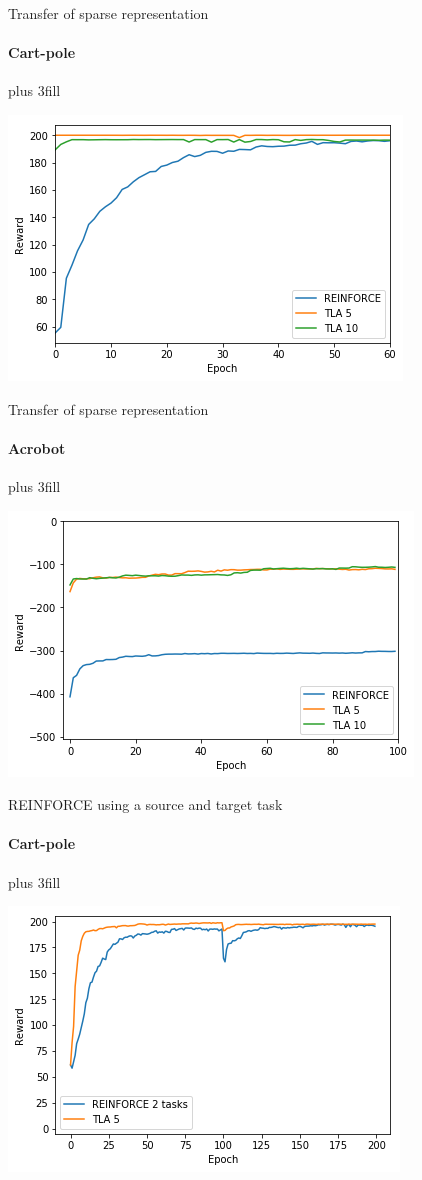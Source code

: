 \documentclass{beamer}
\begin{document}
\begin{frame}[fragile]{Transfer of sparse representation}
\framesubtitle{Cart-pole}
\vskip0pt plus 3fill
\begin{center}
    \includegraphics[width=.8\linewidth]{results/CartPole/sparse_transfer/reward_target_re-akt5-akt10.png}
\end{center}
\end{frame}

\begin{frame}[fragile]{Transfer of sparse representation}
\framesubtitle{Acrobot}
\vskip0pt plus 3fill
\begin{center}
    \includegraphics[width=.8\linewidth]{results/Acrobot/sparse_transfer/reward_target_re-akt5-akt10.png}
\end{center}
\end{frame}

\begin{frame}[fragile]{REINFORCE using a source and target task}
\framesubtitle{Cart-pole}
\vskip0pt plus 3fill
\begin{center}
    \includegraphics[width=.8\linewidth]{results/CartPole/reinforce_2tasks.png}
\end{center}
\end{frame}
\end{document}
